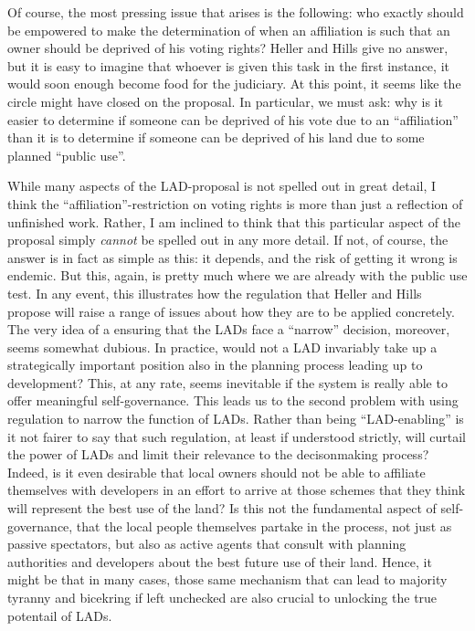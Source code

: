 Of course, the most pressing issue that arises is the following: who exactly should be empowered to make the determination of when an affiliation is such that an owner should be deprived of his voting rights? Heller and Hills give no answer, but it is easy to imagine that whoever is given this task in the first instance, it would soon enough become food for the judiciary. At this point, it seems like the circle might have closed on the proposal. In particular, we must ask: why is it easier to determine if someone can be deprived of his vote due to an ``affiliation'' than it is to determine if someone can be deprived of his land due to some planned ``public use''.

While many aspects of the LAD-proposal is not spelled out in great detail, I think the ``affiliation''-restriction on voting rights is more than just a reflection of unfinished work. Rather, I am inclined to think that this particular aspect of the proposal simply {\it cannot} be spelled out in any more detail. If not, of course, the answer is in fact as simple as this: it depends, and the risk of getting it wrong is endemic. But this, again, is pretty much where we are already with the public use test. In any event, this illustrates how the regulation that Heller and Hills propose will raise a range of issues about how they are to be applied concretely. The very idea of a ensuring that the LADs face a ``narrow'' decision, moreover, seems somewhat dubious. In practice, would not a LAD invariably take up a strategically important position also in the planning process leading up to development? This, at any rate, seems inevitable if the system is really able to offer meaningful self-governance. This leads us to the second problem with using regulation to narrow the function of LADs. Rather than being ``LAD-enabling'' is it not fairer to say that such regulation, at least if understood strictly, will curtail the power of LADs and limit their relevance to the decisonmaking process? Indeed, is it even desirable that local owners should not be able to affiliate themselves with developers in an effort to arrive at those schemes that they think will represent the best use of the land? Is this not the fundamental aspect of self-governance, that the local people themselves partake in the process, not just as passive spectators, but also as active agents that consult with planning authorities and developers about the best future use of their land. Hence, it might be that in many cases, those same mechanism that can lead to majority tyranny and bicekring if left unchecked are also crucial to unlocking the true potentail of LADs.

